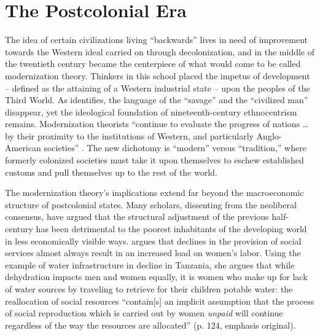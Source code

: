 \documentclass{../../../coursework}
\begin{document}
\section{The Postcolonial Era}

The idea of certain civilizations living ``backwards'' lives in need of
improvement towards the Western ideal carried on through decolonization, and
in the middle of the twentieth century became the centerpiece of what would
come to be called modernization theory. Thinkers in this school placed the
impetus of development -- defined as the attaining of a Western industrial
state -- upon the peoples of the Third World. As \textcite{Tip73} identifies,
the language of the ``savage'' and the ``civilized man'' disappear, yet the
ideological foundation of nineteenth-century ethnocentrism remains.
Modernization theorists ``continue to evaluate the progress of nations \dots
by their proximity to the institutions of Western, and particularly
Anglo-American societies'' \parencite[206]{Tip73}. The new dichotomy is
``modern'' versus ``tradition,'' where formerly colonized societies must take
it upon themselves to eschew established customs and pull themselves up to
the rest of the world.

The modernization theory's implications extend far beyond the macroeconomic
structure of postcolonial states. Many scholars, dissenting from the
neoliberal consensus, have argued that the structural adjustment of the
previous half-century has been detrimental to the poorest inhabitants of the
developing world in less economically visible ways. \textcite{Ear96} argues
that declines in the provision of social services almost always result in an
increased load on women's labor. Using the example of water infrastructure in
decline in Tanzania, she argues that while dehydration impacts men and women
equally, it is women who make up for lack of water sources by traveling to
retrieve for their children potable water: the reallocation of social
resources ``contain[s] an implicit assumption that the process of social
reproduction which is carried out by women \textit{unpaid} will continue
regardless of the way the resources are allocated'' (p. 124, emphasis
original).
\end{document}
